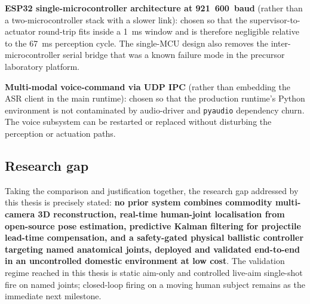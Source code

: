 \textbf{ESP32 single-microcontroller architecture at 921~600~baud} (rather than a two\mbox{-}microcontroller stack with a slower link): chosen so that the supervisor-to-actuator round-trip fits inside a 1~ms window and is therefore negligible relative to the 67~ms perception cycle. The single-MCU design also removes the inter-microcontroller serial bridge that was a known failure mode in the precursor laboratory platform.

\textbf{Multi-modal voice-command via UDP IPC} (rather than embedding the ASR client in the main runtime): chosen so that the production runtime's Python environment is not contaminated by audio-driver and \texttt{pyaudio} dependency churn. The voice subsystem can be restarted or replaced without disturbing the perception or actuation paths.

\subsection{Research gap}

Taking the comparison and justification together, the research gap addressed by this thesis is precisely stated: \textbf{no prior system combines commodity multi-camera 3D reconstruction, real-time human-joint localisation from open-source pose estimation, predictive Kalman filtering for projectile lead-time compensation, and a safety-gated physical ballistic controller targeting named anatomical joints, deployed and validated end-to-end in an uncontrolled domestic environment at low cost}. The validation regime reached in this thesis is static aim-only and controlled live-aim single-shot fire on named joints; closed-loop firing on a moving human subject remains as the immediate next milestone.

